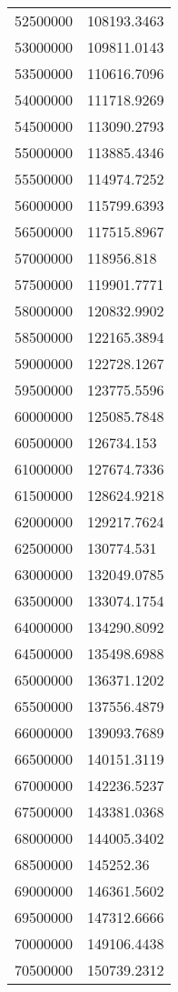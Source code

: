 \documentclass{article}
\begin{document}
\begin{longtable}[c]{ll}
52500000       & 108193.3463 \\
53000000       & 109811.0143 \\
53500000       & 110616.7096 \\
54000000       & 111718.9269 \\
54500000       & 113090.2793 \\
55000000       & 113885.4346 \\
55500000       & 114974.7252 \\
56000000       & 115799.6393 \\
56500000       & 117515.8967 \\
57000000       & 118956.818  \\
57500000       & 119901.7771 \\
58000000       & 120832.9902 \\
58500000       & 122165.3894 \\
59000000       & 122728.1267 \\
59500000       & 123775.5596 \\
60000000       & 125085.7848 \\
60500000       & 126734.153  \\
61000000       & 127674.7336 \\
61500000       & 128624.9218 \\
62000000       & 129217.7624 \\
62500000       & 130774.531  \\
63000000       & 132049.0785 \\
63500000       & 133074.1754 \\
64000000       & 134290.8092 \\
64500000       & 135498.6988 \\
65000000       & 136371.1202 \\
65500000       & 137556.4879 \\
66000000       & 139093.7689 \\
66500000       & 140151.3119 \\
67000000       & 142236.5237 \\
67500000       & 143381.0368 \\
68000000       & 144005.3402 \\
68500000       & 145252.36   \\
69000000       & 146361.5602 \\
69500000       & 147312.6666 \\
70000000       & 149106.4438 \\
70500000       & 150739.2312 \\

\end{longtable}
\end{document}
